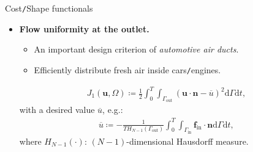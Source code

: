 \documentclass[10pt
hyperref={
    pdfauthor={Hong Quan Ba Nguyen},
    pdftitle={Optimal Shape Design of Air Ducts in Combustion Engines: Design a General Framework},
    pdfsubject={Talk},
    pdfcreator={LaTeX},
}
]{beamer}
\begin{document}
\begin{frame}{Cost\texttt{/}Shape functionals}
    \begin{itemize}
        \item \textbf{Flow uniformity at the outlet.}
        \begin{itemize}
            \item An important design criterion of \textit{automotive air ducts}.
            \item Efficiently distribute fresh air inside cars\texttt{/}engines.
        \end{itemize}
        \begin{align}
            \label{cost functional: outflow uniformity}
            \tag{$J_1$}
            J_1(\textbf{u},\Omega)\coloneqq\frac{1}{2}\int_0^T\int_{\Gamma_{\textrm{out}}} \left(\textbf{u}\cdot\textbf{n} - \overline{u}\right)^2\textrm{d}\Gamma\textrm{d}t,
        \end{align}
        with a desired value $\overline{u}$, e.g.:
        \begin{align*}
            \overline{u}\coloneqq -\frac{1}{TH_{N-1}(\Gamma_{\textrm{out}})}\int_0^T\int_{\Gamma_{\textrm{in}}} \textbf{f}_{\textrm{in}}\cdot\textbf{n}\textrm{d}\Gamma\textrm{d}t,
        \end{align*}
        where $H_{N-1}(\cdot)$: $(N - 1)$-dimensional Hausdorff measure.
    \end{itemize}
\end{frame}
\end{document}
